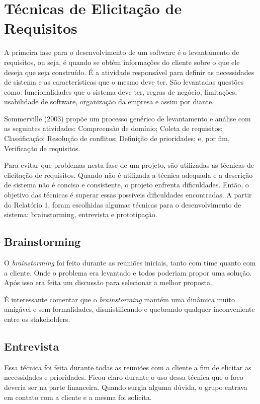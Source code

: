 \chapter[Técnicas de Elicitação de Requisitos]{Técnicas de Elicitação de Requisitos}
A primeira fase para o desenvolvimento de um software é o levantamento de
requisitos, ou seja, é quando se obtém informações do cliente sobre o que ele
deseja que seja construído. É a atividade responsável para definir as necessidades
de sistema e as características que o mesmo deve ter. São levantadas questões como:
funcionalidades que o sistema deve ter, regras de negócio, limitações, usabilidade
de software, organização da empresa e assim por diante.

Sommerville (2003) propõe um processo genérico de levantamento e análise com as
seguintes atividades: Compreensão de domínio; Coleta de requisitos;
Classificação; Resolução de conflitos; Definição de prioridades; e, por fim,
Verificação de requisitos.

Para evitar que problemas nesta fase de um projeto, são utilizadas as
técnicas de elicitação de requisitos. Quando não é utilizada a técnica adequada
 e a descrição de sistema não é conciso e consistente, o projeto enfrenta
dificuldades. Então, o objetivo das técnicas é superar essas possíveis
dificuldades encontradas.
A partir do Relatório 1, foram escolhidas algumas técnicas para o
desenvolvimento de sistema: brainstorming, entrevista e prototipação.

\section[Brainstorming]{Brainstorming}
O \textsl{brainstorming} foi feito durante as reuniões iniciais, tanto com
time quanto com a cliente. Onde o problema era levantado e todos poderiam propor
uma solução. Após isso era feita um discussão para selecionar a melhor proposta.

É interessante comentar que o \textsl{brainstorming} mantém uma dinâmica muito amigável e sem formalidades, dismistificando e quebrando qualquer inconveniente entre os stakeholders.

\section[Entrevista]{Entrevista}
Essa técnica foi feita durante todas as reuniões com a cliente a fim de
elicitar as necessidades e prioridades. Ficou claro durante o uso dessa
técnica que o foco deveria ser na parte financeira. Quando surgia alguma dúvida, o grupo entrava em contato com a cliente e a mesma foi solícita.

